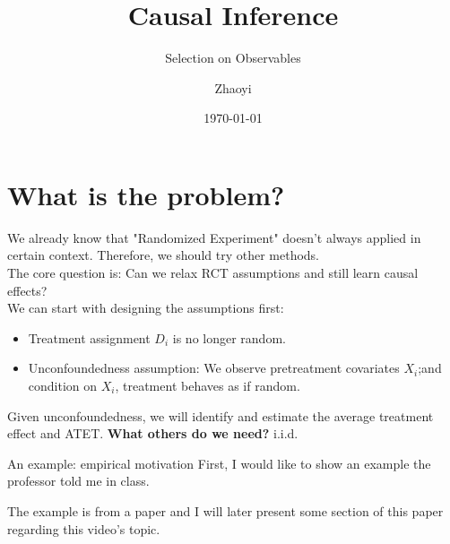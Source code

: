 \documentclass[11pt,aspectratio=169]{beamer}
\title[Causal Inference]{Causal Inference}
\subtitle{Selection on Observables}
\author[Zhaoyi]{Zhaoyi}
\date{\today}
\begin{document}
\begin{titleframe}


\end{titleframe}


\begin{outlineframe}

\end{outlineframe}

\section{What is the problem?}


\begin{frame}
We already know that "Randomized Experiment" doesn't always applied in certain context. Therefore, we should try other methods.\\
The core question is: Can we relax RCT assumptions and still learn causal effects?\\
We can start with designing the assumptions first:
\begin{itemize}
  \item Treatment assignment $D_i$ is no longer random.
  \item Unconfoundedness assumption: We observe pretreatment covariates $X_i$;and condition on $X_i$, treatment behaves as if random.
\end{itemize}

Given unconfoundedness, we will identify and estimate the average treatment effect and ATET.
\pause
\textbf{What others do we need?}
\pause
i.i.d.
\end{frame}
\begin{frame}{An example: empirical motivation}
First, I would like to show an example the professor told me in class.

The example is from a paper and I will later present some section of this paper regarding this video's topic.
\end{frame}
\end{document}
